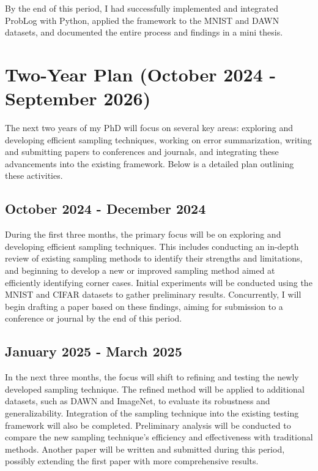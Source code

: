 By the end of this period, I had successfully implemented and integrated ProbLog with Python, applied the framework to the MNIST and DAWN datasets, and documented the entire process and findings in a mini thesis.

\section{Two-Year Plan (October 2024 - September 2026)}

The next two years of my PhD will focus on several key areas: exploring and developing efficient sampling techniques, working on error summarization, writing and submitting papers to conferences and journals, and integrating these advancements into the existing framework. Below is a detailed plan outlining these activities.

\subsection{October 2024 - December 2024}

During the first three months, the primary focus will be on exploring and developing efficient sampling techniques. This includes conducting an in-depth review of existing sampling methods to identify their strengths and limitations, and beginning to develop a new or improved sampling method aimed at efficiently identifying corner cases. Initial experiments will be conducted using the MNIST and CIFAR datasets to gather preliminary results. Concurrently, I will begin drafting a paper based on these findings, aiming for submission to a conference or journal by the end of this period.

\subsection{January 2025 - March 2025}

In the next three months, the focus will shift to refining and testing the newly developed sampling technique. The refined method will be applied to additional datasets, such as DAWN and ImageNet, to evaluate its robustness and generalizability. Integration of the sampling technique into the existing testing framework will also be completed. Preliminary analysis will be conducted to compare the new sampling technique's efficiency and effectiveness with traditional methods. Another paper will be written and submitted during this period, possibly extending the first paper with more comprehensive results.

